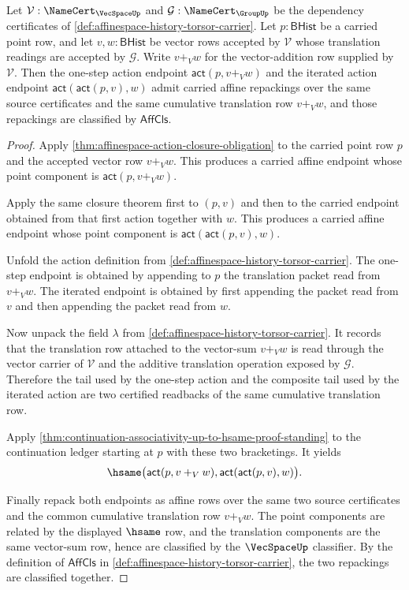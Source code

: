 \begin{theorem}
\label{thm:affinespace-action-additivity}
Let $\mathcal{V}:\NameCert_{\VecSpaceUp}$ and $\mathcal{G}:\NameCert_{\GroupUp}$ be the dependency certificates of \autoref{def:affinespace-history-torsor-carrier}. Let $p:\mathsf{BHist}$ be a carried point row, and let $v,w:\mathsf{BHist}$ be vector rows accepted by $\mathcal{V}$ whose translation readings are accepted by $\mathcal{G}$. Write $v+_V w$ for the vector-addition row supplied by $\mathcal{V}$. Then the one-step action endpoint $\mathsf{act}(p,v+_V w)$ and the iterated action endpoint $\mathsf{act}(\mathsf{act}(p,v),w)$ admit carried affine repackings over the same source certificates and the same cumulative translation row $v+_V w$, and those repackings are classified by $\mathsf{AffCls}$.
\end{theorem}
\begin{proof}
Apply \autoref{thm:affinespace-action-closure-obligation} to the carried point row $p$ and the accepted vector row $v+_V w$. This produces a carried affine endpoint whose point component is $\mathsf{act}(p,v+_V w)$.

Apply the same closure theorem first to $(p,v)$ and then to the carried endpoint obtained from that first action together with $w$. This produces a carried affine endpoint whose point component is $\mathsf{act}(\mathsf{act}(p,v),w)$.

Unfold the action definition from \autoref{def:affinespace-history-torsor-carrier}. The one-step endpoint is obtained by appending to $p$ the translation packet read from $v+_V w$. The iterated endpoint is obtained by first appending the packet read from $v$ and then appending the packet read from $w$.

Now unpack the field $\lambda$ from \autoref{def:affinespace-history-torsor-carrier}. It records that the translation row attached to the vector-sum $v+_V w$ is read through the vector carrier of $\mathcal{V}$ and the additive translation operation exposed by $\mathcal{G}$. Therefore the tail used by the one-step action and the composite tail used by the iterated action are two certified readbacks of the same cumulative translation row.

Apply \autoref{thm:continuation-associativity-up-to-hsame-proof-standing} to the continuation ledger starting at $p$ with these two bracketings. It yields
$$
\hsame\bigl(\mathsf{act}(p,v+_V w),\mathsf{act}(\mathsf{act}(p,v),w)\bigr).
$$

Finally repack both endpoints as affine rows over the same two source certificates and the common cumulative translation row $v+_V w$. The point components are related by the displayed $\hsame$ row, and the translation components are the same vector-sum row, hence are classified by the $\VecSpaceUp$ classifier. By the definition of $\mathsf{AffCls}$ in \autoref{def:affinespace-history-torsor-carrier}, the two repackings are classified together.
\end{proof}

